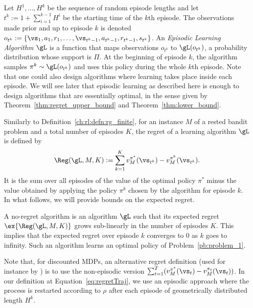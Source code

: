 Let $H^1,\ldots, H^k$ be the sequence of random episode lengths and let
$t^k:=1{+}\sum_{i=1}^{k-1}H^i$ be the starting time of the $k$th episode.
The observations made prior and up to episode \(k\) is denoted \(o_{t^{k}}:=\{\vs_1,a_1,r_1,\dots,\vs_{t^k-1},a_{t^k-1},r_{t^k-1},s_{t^k}\}\).
An \emph{Episodic Learning
Algorithm} \(\gL\) is a function that maps observations \(o_{t^k}\) to
\(\gL(o_{t^k})\), a probability distribution whose support is $\Pi$.  At the
beginning of episode $k$, the algorithm samples \(\pi^k\sim\gL(o_{t^k})\)
and uses this policy during the whole $k$th episode. Note that one could also
design algorithms where learning takes place inside each episode. We will see
later that episodic learning as described here is enough to design algorithms
that are essentially optimal, in the sense given by Theorem~\ref{thm:regret_upper_bound} and Theorem~\ref{thm:lower_bound}.

Similarly to Definition~\ref{ch:rl:defn:rg_finite}, for an instance \(M\) of a rested bandit problem and a total number of episodes $K$, the regret of a learning algorithm \(\gL\) is defined by
\begin{align}
  \Reg(\gL,M,K) :=  \sum_{k=1}^K %
      v^{\pi^*}_M(\vs_{t^k}) - v^{\pi^k}_M(\vs_{t^k})%
      .\label{eq:regretTraj}
\end{align}
It is the sum over all episodes of the value of the optimal policy $\pi^*$ minus the value obtained by applying the policy $\pi^k$ chosen by the algorithm for episode $k$. In what follows, we will provide bounds on the expected regret.

A no-regret algorithm is an algorithm $\gL$ such that its expected regret $\ex{\Reg(\gL,M,K)}$ grows sub-linearly in the number of episodes $K$. This implies that the expected regret over episode $k$  converges to $0$ as $k$ goes to infinity. Such an algorithm learns an optimal policy of Problem~\ref{pb:problem_1}.

Note that, for discounted MDPs, an alternative regret definition (used for instance by \cite{zhou2021nearly}) is to use the non-episodic version $\sum_{t=1}^T (v^{\pi^*}_M(\vs_{t}) - v^{\pi_t}_M(\vs_{t}))$. In our definition at Equation~\eqref{eq:regretTraj}, we use an episodic approach where the process is restarted according to $\rho$ after each episode of geometrically distributed length $H^k$.

